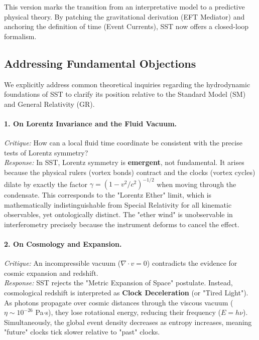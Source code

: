 \documentclass[10pt]{article}
\begin{document}
This version marks the transition from an interpretative model to a predictive physical theory. By patching the gravitational derivation (EFT Mediator) and anchoring the definition of time (Event Currents), SST now offers a closed-loop formalism.

\subsection*{Addressing Fundamental Objections}
We explicitly address common theoretical inquiries regarding the hydrodynamic foundations of SST to clarify its position relative to the Standard Model (SM) and General Relativity (GR).

\paragraph{1. On Lorentz Invariance and the Fluid Vacuum.}
\textit{Critique:} How can a local fluid time coordinate be consistent with the precise tests of Lorentz symmetry? \\
\textit{Response:} In SST, Lorentz symmetry is \textbf{emergent}, not fundamental. It arises because the physical rulers (vortex bonds) contract and the clocks (vortex cycles) dilate by exactly the factor $\gamma = (1-v^2/c^2)^{-1/2}$ when moving through the condensate. This corresponds to the "Lorentz Ether" limit, which is mathematically indistinguishable from Special Relativity for all kinematic observables, yet ontologically distinct. The "ether wind" is unobservable in interferometry precisely because the instrument deforms to cancel the effect.

\paragraph{2. On Cosmology and Expansion.}
\textit{Critique:} An incompressible vacuum ($\nabla \cdot v = 0$) contradicts the evidence for cosmic expansion and redshift. \\
\textit{Response:} SST rejects the "Metric Expansion of Space" postulate. Instead, cosmological redshift is interpreted as \textbf{Clock Deceleration} (or "Tired Light"). As photons propagate over cosmic distances through the viscous vacuum ($\eta \sim 10^{-26}$ Pa$\cdot$s), they lose rotational energy, reducing their frequency ($E=h\nu$). Simultaneously, the global event density decreases as entropy increases, meaning "future" clocks tick slower relative to "past" clocks.
\end{document}
